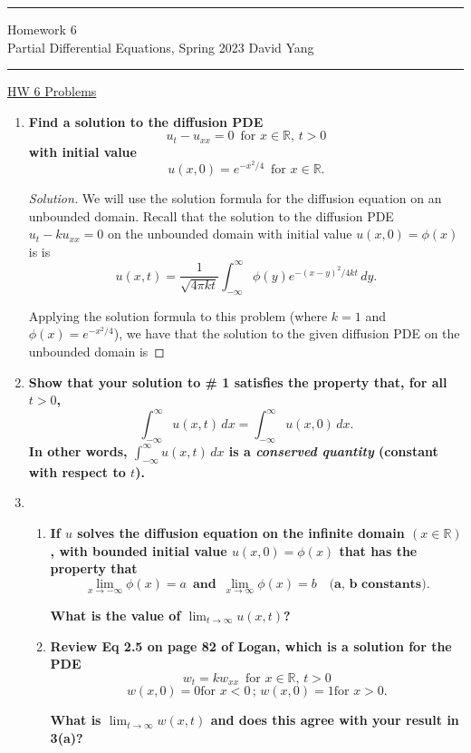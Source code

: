 \documentclass[11pt]{article}
\newenvironment{solution}
  {\renewcommand\qedsymbol{$\blacksquare$}\begin{proof}[Solution]}
  {\end{proof}}
\begin{document}
	\hrule
	\begin{center}
		{\Large Homework 6} \\ %
		\vspace{0.2cm}
		Partial Differential Equations, Spring 2023 \hfill David Yang %
	\end{center}

\hrule

\vspace{1em}

\underline{HW 6 Problems} 
\begin{enumerate}
\item \textbf{Find a solution to the diffusion PDE} \[ u_t - u_{xx} = 0 \, \, \, \text{for } x \in \mathbb{R}, \, t > 0\] \textbf{with initial value} 
\[ u(x, 0) = e^{-x^2/4} \, \, \, \text{for } x \in \mathbb{R}.\]

\begin{solution}
We will use the solution formula for the diffusion equation on an unbounded domain. Recall that the solution to the diffusion PDE $u_t - ku_{xx} = 0$ on the unbounded domain with initial value $u(x, 0) = \phi(x)$ is
is \[ u(x, t) = \frac{1}{\sqrt{4\pi k t}} \int_{-\infty}^{\infty} \phi(y) e^{-(x-y)^2/4kt} \, dy.\]

Applying the solution formula to this problem (where $k=1$ and $\phi(x) = e^{-x^2/4}$), we have that the solution to the given diffusion PDE on the unbounded domain is
\end{solution}

\item \textbf{Show that your solution to \# 1 satisfies the property that, for all $t > 0$,}
\[ \int_{-\infty}^{\infty} u(x, t) \, dx = \int_{-\infty}^{\infty} u(x, 0) \, dx.  \]
\textbf{In other words, $\int_{-\infty}^{\infty} u(x, t) \, dx$ is a \textit{conserved quantity} (constant with respect to $t$). }

\item \begin{enumerate}
	
\item \textbf{If $u$ solves the diffusion equation on the infinite domain $(x \in \mathbb{R})$, with bounded initial value $u(x, 0) = \phi(x)$ that has the property that}
\[ \lim_{x \rightarrow -\infty} \phi(x) = a \, \, \, \textbf{and} \, \, \, \lim_{x \rightarrow \infty} \phi(x) = b \, \, \, \, \, \,\textbf{(a, b constants)}.\]

\textbf{What is the value of $\lim_{t\rightarrow \infty} u(x, t)$?}

\item \textbf{Review Eq 2.5 on page 82 of Logan, which is a solution for the PDE}
\[ w_t = kw_{xx} \, \, \, \text{for } x \in \mathbb{R}, \, t > 0\]
\[ w(x, 0) = 0 \text{for } x < 0 \, ; \, w(x, 0) = 1 \text{for } x > 0.\]

\textbf{What is $\lim_{t \rightarrow \infty} w(x, t)$ and does this agree with your result in 3(a)?}
\end{enumerate}
\end{enumerate}
\end{document}
